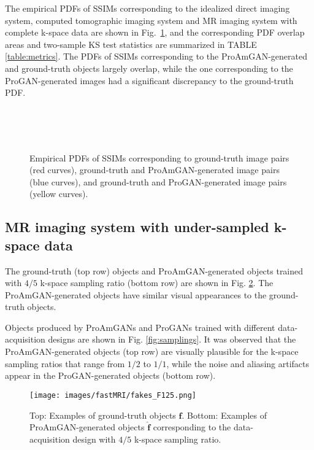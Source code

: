 \documentclass[journal]{IEEEtran}
\renewcommand{\vec}[1]{\mathbf{#1}}
\begin{document}
The empirical PDFs of
SSIMs corresponding to the idealized direct imaging system, computed tomographic imaging system and MR imaging system with complete k-space data
are shown in Fig.~\ref{fig:ssim_x}, and the corresponding PDF overlap areas and two-sample KS test statistics are summarized in TABLE \ref{table:metrics}.
The PDFs of SSIMs corresponding to the ProAmGAN-generated and ground-truth objects largely overlap, while 
the one corresponding to the ProGAN-generated images had a significant discrepancy to the ground-truth PDF.
\vspace{-0.3cm}
\begin{figure}[H]
\centering
    \\[-0.5ex]
 \\[-0.5ex]
  \\[-0.5ex]
  \vspace{-0.1cm}
  \caption{Empirical PDFs of SSIMs corresponding to ground-truth image pairs (red curves), ground-truth and ProAmGAN-generated image pairs (blue curves), and ground-truth and ProGAN-generated image pairs (yellow curves).}
	\label{fig:ssim_x}
	\vspace{-0.2cm}
\end{figure}

\subsection{MR imaging system with under-sampled k-space data}
\vspace{-0.1cm}
The ground-truth (top row) objects and ProAmGAN-generated objects trained with ${4}/{5}$ k-space sampling ratio (bottom row) are shown in Fig. \ref{fig:fastMR}. 
The ProAmGAN-generated objects have similar visual appearances to the ground-truth objects.


Objects produced by ProAmGANs and ProGANs trained with different data-acquisition designs are shown in Fig. \ref{fig:samplings}.
It was observed that the ProAmGAN-generated objects (top row)
are visually plausible for the k-space sampling ratios that range from ${1}/{2}$ to ${1}/{1}$, while
the noise and aliasing artifacts appear in the ProGAN-generated objects (bottom row).
\vspace{-0.2cm}
\begin{figure}[H]
   \centering
    \texttt{[image: images/fastMRI/fakes\_F125.png]}
 \caption{Top: Examples of ground-truth objects $\vec{f}$. Bottom: Examples of ProAmGAN-generated objects $\hat{\vec{f}}$ corresponding to the data-acquisition design with ${4}/{5}$  k-space sampling ratio.}
 \label{fig:fastMR}
 \vspace{-0.3cm}
\end{figure}
\end{document}
